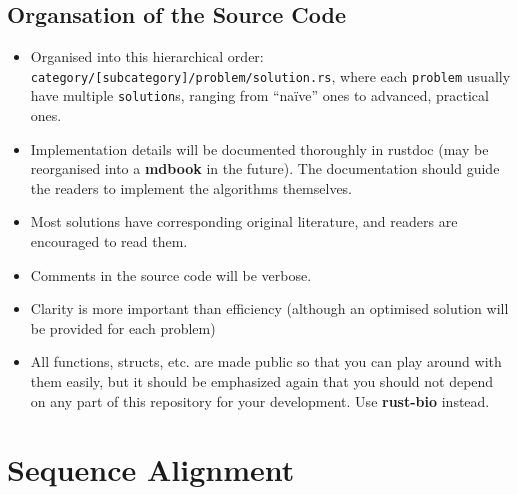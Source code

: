 \documentclass[
]{book}
\providecommand{\tightlist}{%
  \setlength{\itemsep}{0pt}\setlength{\parskip}{0pt}}
\begin{document}
\hypertarget{organsation-of-the-source-code}{%
\section*{Organsation of the Source Code}\label{organsation-of-the-source-code}}

\begin{itemize}
\tightlist
\item
  Organised into this hierarchical order: \texttt{category/{[}subcategory{]}/problem/solution.rs}, where each \texttt{problem} usually have multiple \texttt{solution}s, ranging from ``naïve'' ones to advanced, practical ones.
\item
  Implementation details will be documented thoroughly in rustdoc (may be reorganised into a \textbf{mdbook} in the future). The documentation should guide the readers to implement the algorithms themselves.
\item
  Most solutions have corresponding original literature, and readers are encouraged to read them.
\item
  Comments in the source code will be verbose.
\item
  Clarity is more important than efficiency (although an optimised solution will be provided for each problem)
\item
  All functions, structs, etc. are made public so that you can play around with them easily, but it should be emphasized again that you should not depend on any part of this repository for your development. Use \textbf{rust-bio} instead.
\end{itemize}

\hypertarget{sequence-alignment}{%
\chapter{Sequence Alignment}\label{sequence-alignment}}

  
\end{document}
